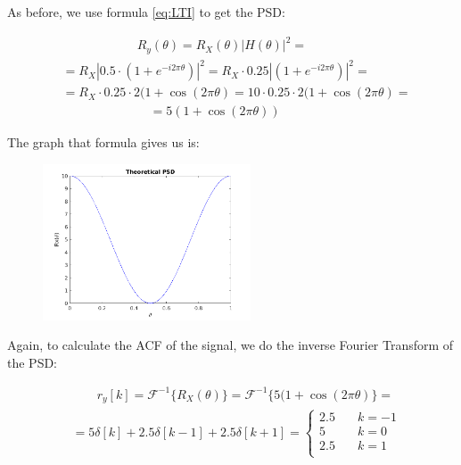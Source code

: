 \documentclass[a4paper,11pt]{article}
\begin{document}
As before, we use formula \eqref{eq:LTI} to get the PSD:

\begin{equation}\label{eq:R_ld_th}
  \begin{split}
   & \qquad\qquad\qquad R_y(\theta) = R_X(\theta) |H(\theta)|^2 = \\
   & = R_X |0.5 \cdot (1 + e^{-i 2 \pi \theta})|^2 =
   R_X \cdot 0.25 |(1 + e^{-i 2 \pi \theta})|^2 = \\
   & = R_X \cdot 0.25 \cdot 2 (1 + \cos(2 \pi \theta) =
   10 \cdot 0.25 \cdot 2 (1 + \cos(2 \pi \theta) = \\
   & \qquad\qquad\qquad\quad = 5 (1 + \cos(2 \pi \theta))
 \end{split}
\end{equation}

\newpage

The graph that formula gives us is:

\begin{figure}[!hp]
    \begin{center}
      \includegraphics[width=0.55\textwidth]{images/study1/R_ld_th.png}
    \end{center}
\end{figure}

Again, to calculate the ACF of the signal, we do the inverse Fourier Transform
of the PSD:

\begin{equation}\label{eq:r_ld_th}
  \begin{split}
     & \qquad r_y[k] = \mathcal{F}^{-1}\{R_X(\theta)\} =
     \mathcal{F}^{-1}\{5 (1 + \cos(2 \pi \theta)\} = \\
     & = 5\delta[k] + 2.5\delta[k-1] + 2.5\delta[k+1] =
     \begin{cases}
         2.5 &\quad k = -1\\
         5 &\quad k = 0\\
         2.5 &\quad k = 1\\
     \end{cases}
 \end{split}
\end{equation}
\end{document}
